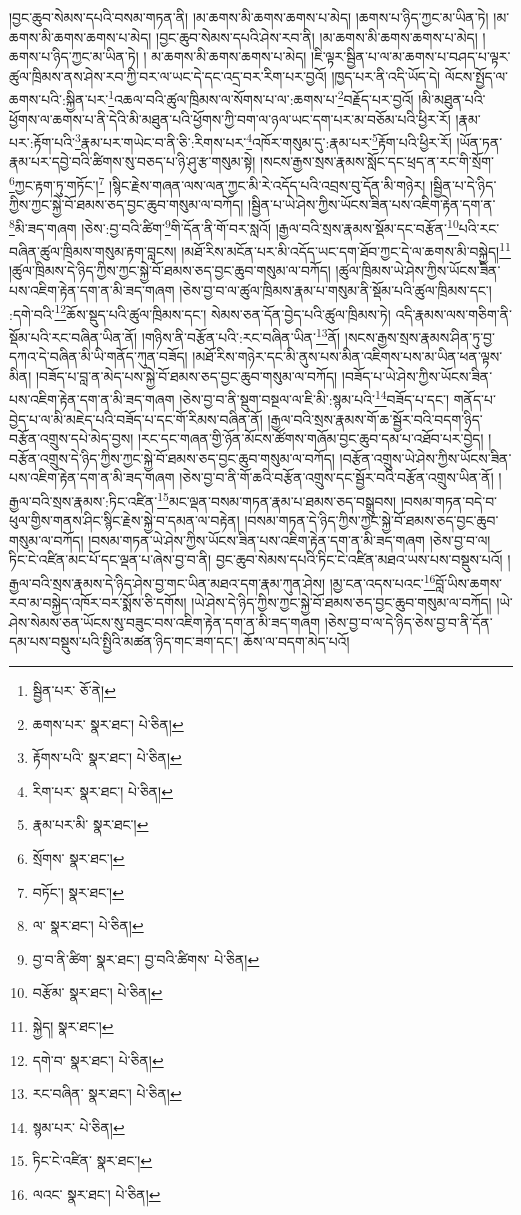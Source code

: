 །བྱང་ཆུབ་སེམས་དཔའི་བསམ་གཏན་ནི། །མ་ཆགས་མི་ཆགས་ཆགས་པ་མེད། །ཆགས་པ་ཉིད་ཀྱང་མ་ཡིན་ཏེ། །མ་ཆགས་མི་ཆགས་ཆགས་པ་མེད། །བྱང་ཆུབ་སེམས་དཔའི་ཤེས་རབ་ནི། །མ་ཆགས་མི་ཆགས་ཆགས་པ་མེད། །ཆགས་པ་ཉིད་ཀྱང་མ་ཡིན་ཏེ། །
མ་ཆགས་མི་ཆགས་ཆགས་པ་མེད། །ཇི་ལྟར་སྦྱིན་པ་ལ་མ་ཆགས་པ་བཤད་པ་ལྟར་ཚུལ་ཁྲིམས་ནས་ཤེས་རབ་ཀྱི་བར་ལ་ཡང་དེ་དང་འདྲ་བར་རིག་པར་བྱའོ། །ཁྱད་པར་ནི་འདི་ཡོད་དེ། ལོངས་སྤྱོད་ལ་ཆགས་པའི་:སྐྱིན་པར་\footnote{སྦྱིན་པར་  ཅོ་ནེ། }འཆལ་བའི་ཚུལ་ཁྲིམས་ལ་སོགས་པ་ལ་:ཆགས་པ་\footnote{ཆགས་པར་  སྣར་ཐང་།  པེ་ཅིན། }བརྗོད་པར་བྱའོ། །མི་མཐུན་པའི་ཕྱོགས་ལ་ཆགས་པ་ནི་དེའི་མི་མཐུན་པའི་ཕྱོགས་ཀྱི་བག་ལ་ཉལ་ཡང་དག་པར་མ་བཅོམ་པའི་ཕྱིར་རོ། །རྣམ་པར་:རྟོག་པའི་\footnote{རྟོགས་པའི་  སྣར་ཐང་།  པེ་ཅིན། }རྣམ་པར་གཡེང་བ་ནི་ཅི་:རིགས་པར་\footnote{རིག་པར་  སྣར་ཐང་།  པེ་ཅིན། }འཁོར་གསུམ་དུ་:རྣམ་པར་\footnote{རྣམ་པར་མི་  སྣར་ཐང་། }རྟོག་པའི་ཕྱིར་རོ། །ཡོན་ཏན་རྣམ་པར་དབྱེ་བའི་ཚིགས་སུ་བཅད་པ་ཉི་ཤུ་རྩ་གསུམ་སྟེ། །སངས་རྒྱས་སྲས་རྣམས་སློང་དང་ཕྲད་ན་རང་གི་སྲོག་\footnote{སྲོགས་  སྣར་ཐང་། }ཀྱང་རྟག་ཏུ་གཏོང་།\footnote{བཏོང་།  སྣར་ཐང་། } །སྙིང་རྗེས་གཞན་ལས་ལན་ཀྱང་མི་རེ་འདོད་པའི་འབྲས་བུ་དོན་མི་གཉེར། །སྦྱིན་པ་དེ་ཉིད་ཀྱིས་ཀྱང་སྐྱེ་བོ་ཐམས་ཅད་བྱང་ཆུབ་གསུམ་ལ་བཀོད། །སྦྱིན་པ་ཡེ་ཤེས་ཀྱིས་ཡོངས་ཟིན་པས་འཇིག་རྟེན་དག་ན་\footnote{ལ་  སྣར་ཐང་།  པེ་ཅིན། }མི་ཟད་གཞག །ཅེས་:བྱ་བའི་ཚིག་\footnote{བྱ་བ་ནི་ཚིག་  སྣར་ཐང་། བྱ་བའི་ཚིགས་  པེ་ཅིན། }གི་དོན་ནི་གོ་བར་སླའོ། །རྒྱལ་བའི་སྲས་རྣམས་སྡོམ་དང་བརྩོན་\footnote{བརྩོམ་  སྣར་ཐང་།  པེ་ཅིན། }པའི་རང་བཞིན་ཚུལ་ཁྲིམས་གསུམ་རྟག་བླངས། །མཐོ་རིས་མངོན་པར་མི་འདོད་ཡང་དག་ཐོབ་ཀྱང་དེ་ལ་ཆགས་མི་བསྐྱེད།\footnote{སྐྱེད།  སྣར་ཐང་། } །ཚུལ་ཁྲིམས་དེ་ཉིད་ཀྱིས་ཀྱང་སྐྱེ་བོ་ཐམས་ཅད་བྱང་ཆུབ་གསུམ་ལ་བཀོད། །ཚུལ་ཁྲིམས་ཡེ་ཤེས་ཀྱིས་ཡོངས་ཟིན་པས་འཇིག་རྟེན་དག་ན་མི་ཟད་གཞག །ཅེས་བྱ་བ་ལ་ཚུལ་ཁྲིམས་རྣམ་པ་གསུམ་ནི་སྡོམ་པའི་ཚུལ་ཁྲིམས་དང་། :དགེ་བའི་\footnote{དགེ་བ་  སྣར་ཐང་།  པེ་ཅིན། }ཆོས་སྡུད་པའི་ཚུལ་ཁྲིམས་དང་། སེམས་ཅན་དོན་བྱེད་པའི་ཚུལ་ཁྲིམས་ཏེ། འདི་རྣམས་ལས་གཅིག་ནི་སྡོམ་པའི་རང་བཞིན་ཡིན་ནོ། །གཉིས་ནི་བརྩོན་པའི་:རང་བཞིན་ཡིན་\footnote{རང་བཞིན་  སྣར་ཐང་།  པེ་ཅིན། }ནོ། །སངས་རྒྱས་སྲས་རྣམས་ཤིན་ཏུ་བྱ་དཀའ་དེ་བཞིན་མི་ཡི་གནོད་ཀུན་བཟོད། །མཐོ་རིས་གཉེར་དང་མི་ནུས་པས་མིན་འཇིགས་པས་མ་ཡིན་ཕན་ལྟས་མིན། །བཟོད་པ་བླ་ན་མེད་པས་སྐྱེ་བོ་ཐམས་ཅད་བྱང་ཆུབ་གསུམ་ལ་བཀོད། །བཟོད་པ་ཡེ་ཤེས་ཀྱིས་ཡོངས་ཟིན་པས་འཇིག་རྟེན་དག་ན་མི་ཟད་གཞག །ཅེས་བྱ་བ་ནི་སྡུག་བསྔལ་ལ་ཇི་མི་:སྙམ་པའི་\footnote{སྙམ་པར་  པེ་ཅིན། }བཟོད་པ་དང་། གནོད་པ་བྱེད་པ་ལ་མི་མཇེད་པའི་བཟོད་པ་དང་གོ་རིམས་བཞིན་ནོ། །རྒྱལ་བའི་སྲས་རྣམས་གོ་ཆ་སྦྱོར་བའི་བདག་ཉིད་བརྩོན་འགྲུས་དཔེ་མེད་བྱས། །རང་དང་གཞན་གྱི་ཉོན་མོངས་ཚོགས་གཞོམ་བྱང་ཆུབ་དམ་པ་འཐོབ་པར་བྱེད། །བརྩོན་འགྲུས་དེ་ཉིད་ཀྱིས་ཀྱང་སྐྱེ་བོ་ཐམས་ཅད་བྱང་ཆུབ་གསུམ་ལ་བཀོད། །བརྩོན་འགྲུས་ཡེ་ཤེས་ཀྱིས་ཡོངས་ཟིན་པས་འཇིག་རྟེན་དག་ན་མི་ཟད་གཞག །ཅེས་བྱ་བ་ནི་གོ་ཆའི་བརྩོན་འགྲུས་དང་སྦྱོར་བའི་བརྩོན་འགྲུས་ཡིན་ནོ། །རྒྱལ་བའི་སྲས་རྣམས་:ཏིང་འཛིན་\footnote{ཏིང་ངེ་འཛིན་  སྣར་ཐང་། }མང་ལྡན་བསམ་གཏན་རྣམ་པ་ཐམས་ཅད་བསྒྲུབས། །བསམ་གཏན་བདེ་བ་ཕུལ་གྱིས་གནས་ཤིང་སྙིང་རྗེས་སྐྱེ་བ་དམན་ལ་བརྟེན། །བསམ་གཏན་དེ་ཉིད་ཀྱིས་ཀྱང་སྐྱེ་བོ་ཐམས་ཅད་བྱང་ཆུབ་གསུམ་ལ་བཀོད། །བསམ་གཏན་ཡེ་ཤེས་ཀྱིས་ཡོངས་ཟིན་པས་འཇིག་རྟེན་དག་ན་མི་ཟད་གཞག །ཅེས་བྱ་བ་ལ། ཏིང་ངེ་འཛིན་མང་པོ་དང་ལྡན་པ་ཞེས་བྱ་བ་ནི། བྱང་ཆུབ་སེམས་དཔའི་ཏིང་ངེ་འཛིན་མཐའ་ཡས་པས་བསྡུས་པའོ། །རྒྱལ་བའི་སྲས་རྣམས་དེ་ཉིད་ཤེས་བྱ་གང་ཡིན་མཐའ་དག་རྣམ་ཀུན་ཤེས། །མྱ་ངན་འདས་པའང་\footnote{ལའང་  སྣར་ཐང་།  པེ་ཅིན། }བློ་ཡིས་ཆགས་རབ་མ་བསྐྱེད་འཁོར་བར་སྨོས་ཅི་དགོས། །ཡེ་ཤེས་དེ་ཉིད་ཀྱིས་ཀྱང་སྐྱེ་བོ་ཐམས་ཅད་བྱང་ཆུབ་གསུམ་ལ་བཀོད། །ཡེ་ཤེས་སེམས་ཅན་ཡོངས་སུ་བཟུང་བས་འཇིག་རྟེན་དག་ན་མི་ཟད་གཞག །ཅེས་བྱ་བ་ལ་དེ་ཉིད་ཅེས་བྱ་བ་ནི་དོན་དམ་པས་བསྡུས་པའི་སྤྱིའི་མཚན་ཉིད་གང་ཟག་དང་། ཆོས་ལ་བདག་མེད་པའོ། 